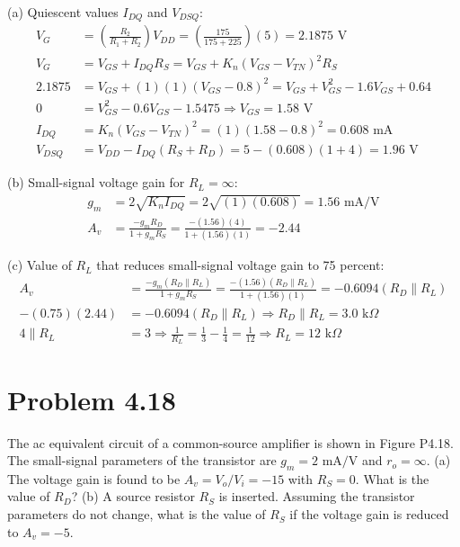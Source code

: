 \documentclass{article}
\begin{document}
(a) Quiescent values $I_{DQ}$ and $V_{DSQ}$:
\begin{align*}
    V_G &= \left(\frac{R_2}{R_1 + R_2}\right) V_{DD} = \left(\frac{175}{175 + 225}\right)(5) = 2.1875\text{ V} \\
    V_G &= V_{GS} + I_{DQ}R_S = V_{GS} + K_n(V_{GS} - V_{TN})^2 R_S \\
    2.1875 &= V_{GS} + (1)(1)(V_{GS} - 0.8)^2 = V_{GS} + V_{GS}^2 - 1.6V_{GS} + 0.64 \\
    0 &= V_{GS}^2 - 0.6V_{GS} - 1.5475 \Rightarrow V_{GS} = 1.58\text{ V} \\
    I_{DQ} &= K_n(V_{GS} - V_{TN})^2 = (1)(1.58 - 0.8)^2 = 0.608\text{ mA} \\
    V_{DSQ} &= V_{DD} - I_{DQ}(R_S + R_D) = 5 - (0.608)(1 + 4) = 1.96\text{ V}
\end{align*}

(b) Small-signal voltage gain for $R_L = \infty$:
\begin{align*}
    g_m &= 2\sqrt{K_n I_{DQ}} = 2\sqrt{(1)(0.608)} = 1.56\text{ mA/V} \\
    A_v &= \frac{-g_m R_D}{1 + g_m R_S} = \frac{-(1.56)(4)}{1 + (1.56)(1)} = -2.44
\end{align*}

(c) Value of $R_L$ that reduces small-signal voltage gain to 75 percent:
\begin{align*}
    A_v &= \frac{-g_m (R_D \parallel R_L)}{1 + g_m R_S} = \frac{-(1.56)(R_D \parallel R_L)}{1 + (1.56)(1)} = -0.6094(R_D \parallel R_L) \\
    -(0.75)(2.44) &= -0.6094(R_D \parallel R_L) \Rightarrow R_D \parallel R_L = 3.0\text{ k}\Omega \\
    4 \parallel R_L &= 3 \Rightarrow \frac{1}{R_L} = \frac{1}{3} - \frac{1}{4} = \frac{1}{12} \Rightarrow R_L = 12\text{ k}\Omega
\end{align*}

\pagebreak
\section{Problem 4.18}

The ac equivalent circuit of a common-source amplifier is shown in Figure P4.18. The small-signal parameters of the transistor are $g_m = 2\text{ mA/V}$ and $r_o = \infty$. (a) The voltage gain is found to be $A_v = V_o/V_i = -15$ with $R_S = 0$. What is the value of $R_D$? (b) A source resistor $R_S$ is inserted. Assuming the transistor parameters do not change, what is the value of $R_S$ if the voltage gain is reduced to $A_v = -5$.
\end{document}
